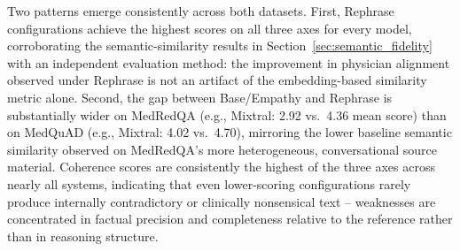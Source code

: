 \begin{table}[t]
\centering
\caption{LLM-as-judge evaluation (Qwen3-32B) on the MedRedQA dataset ($n=200$). Each axis is scored independently on a 1--5 scale by a separate judge call.}
\label{tab:llm_judge_medredqa}
\end{table}

Two patterns emerge consistently across both datasets. First, Rephrase configurations achieve the highest scores on all three axes for every model, corroborating the semantic-similarity results in Section~\ref{sec:semantic_fidelity} with an independent evaluation method: the improvement in physician alignment observed under Rephrase is not an artifact of the embedding-based similarity metric alone. Second, the gap between Base/Empathy and Rephrase is substantially wider on MedRedQA (e.g., Mixtral: 2.92 vs.\ 4.36 mean score) than on MedQuAD (e.g., Mixtral: 4.02 vs.\ 4.70), mirroring the lower baseline semantic similarity observed on MedRedQA's more heterogeneous, conversational source material. Coherence scores are consistently the highest of the three axes across nearly all systems, indicating that even lower-scoring configurations rarely produce internally contradictory or clinically nonsensical text -- weaknesses are concentrated in factual precision and completeness relative to the reference rather than in reasoning structure.
